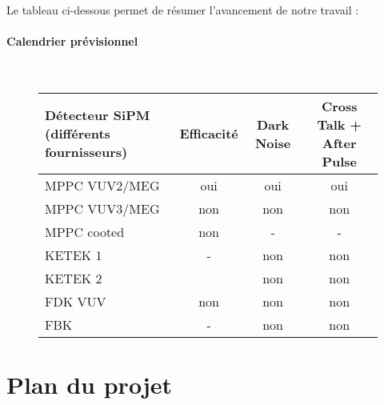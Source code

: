 \documentclass[a4paper, 11pt]{report}%
\begin{document}
  Le tableau ci-dessous permet de r\'esumer l'avancement de notre travail : 
  
  \paragraph{Calendrier pr\'evisionnel}
  \hspace{1cm}\\ 
  \begin{figure}[!hbtp]
  \centering
  \begin{tabular}{|l|c|c|c|}
  \hline
  D\'etecteur SiPM (diff\'erents fournisseurs) &Efficacit\'e &Dark Noise &Cross Talk + After Pulse\\
  \hline
  MPPC VUV2/MEG &oui &oui &oui\\
  \hline
  MPPC VUV3/MEG &non &non &non\\
  \hline
  MPPC cooted &non &- &-\\
  \hline
  KETEK 1 &- &non &non\\
  \hline
  KETEK 2 & &non &non\\
  \hline
  FDK VUV &non &non &non\\
  \hline
  FBK &- &non &non\\
  \hline
  \end{tabular}
  \end{figure}
  
\section{Plan du projet}
 
\end{document}
